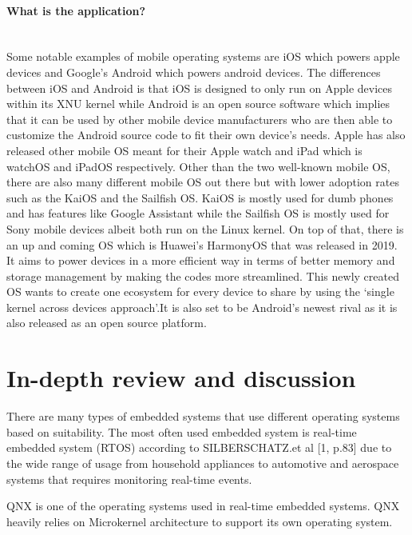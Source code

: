 \documentclass[conference]{IEEEtran}
\begin{document}
\paragraph{What is the application?}\mbox{} \\
Some notable examples of mobile operating systems are iOS which powers apple devices and Google’s Android which powers android devices. The differences between iOS and Android is that iOS is designed to only run on Apple devices within its XNU kernel while Android is an open source software which implies that it can be used by other mobile device manufacturers who are then able to customize the Android source code to fit their own device’s needs. Apple has also released other mobile OS meant for their Apple watch and iPad which is watchOS and iPadOS respectively. Other than the two well-known mobile OS, there are also many different mobile OS out there but with lower adoption rates such as the KaiOS and the Sailfish OS. KaiOS is mostly used for dumb phones and has features like Google Assistant while the Sailfish OS is mostly used for Sony mobile devices albeit both run on the Linux kernel. On top of that, there is an up and coming OS which is Huawei’s HarmonyOS that was released in 2019. It aims to power devices in a more efficient way in terms of better memory and storage management by making the codes more streamlined. This newly created OS wants to create one ecosystem for every device to share by using the ‘single kernel across devices approach’.It is also set to be Android’s newest rival as it is also released as an open source platform.



\section{In-depth review and discussion}
There are many types of embedded systems that use different operating systems based on suitability. The most often used embedded system is real-time embedded system (RTOS) according to SILBERSCHATZ.et al [1, p.83] due to the wide range of usage from household appliances to automotive and aerospace systems that requires monitoring real-time events.

QNX is one of the operating systems used in real-time embedded systems. QNX heavily relies on Microkernel architecture to support its own operating system.
\end{document}

